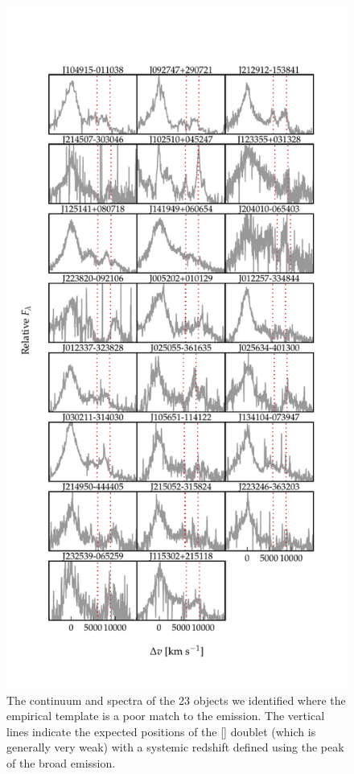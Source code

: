 \begin{figure}
    \centering
    \includegraphics[width=\columnwidth]{figures/chapter04/example_spectrum_grid_extreme_fe.pdf} 
    \caption{The continuum and  spectra of the 23 objects we identified where the \citet{boroson92} empirical template is a poor match to the  emission. The vertical lines indicate the expected positions of the [] doublet (which is generally very weak) with a systemic redshift defined using the peak of the broad \hb emission.}     
    \label{fig:bad_fe}
\end{figure}

